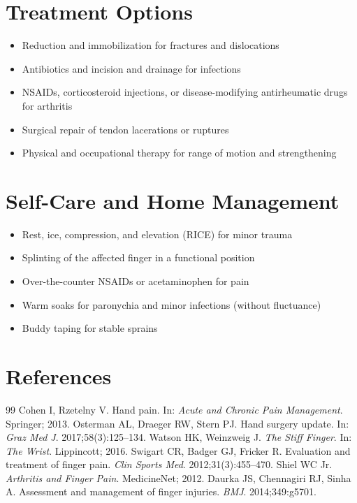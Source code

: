 \section*{Treatment Options}
\begin{itemize}
  \item Reduction and immobilization for fractures and dislocations
  \item Antibiotics and incision and drainage for infections
  \item NSAIDs, corticosteroid injections, or disease-modifying antirheumatic drugs for arthritis
  \item Surgical repair of tendon lacerations or ruptures
  \item Physical and occupational therapy for range of motion and strengthening
\end{itemize}


\section*{Self-Care and Home Management}
\begin{itemize}
  \item Rest, ice, compression, and elevation (RICE) for minor trauma
  \item Splinting of the affected finger in a functional position
  \item Over-the-counter NSAIDs or acetaminophen for pain
  \item Warm soaks for paronychia and minor infections (without fluctuance)
  \item Buddy taping for stable sprains
\end{itemize}

\section*{References}
\begin{thebibliography}{99}
Cohen I, Rzetelny V. Hand pain. In: \textit{Acute and Chronic Pain Management}. Springer; 2013.
Osterman AL, Draeger RW, Stern PJ. Hand surgery update. In: \textit{Graz Med J}. 2017;58(3):125--134.
Watson HK, Weinzweig J. \textit{The Stiff Finger}. In: \textit{The Wrist}. Lippincott; 2016.
Swigart CR, Badger GJ, Fricker R. Evaluation and treatment of finger pain. \textit{Clin Sports Med}. 2012;31(3):455--470.
Shiel WC Jr. \textit{Arthritis and Finger Pain}. MedicineNet; 2012.
Daurka JS, Chennagiri RJ, Sinha A. Assessment and management of finger injuries. \textit{BMJ}. 2014;349:g5701.
\end{thebibliography}
